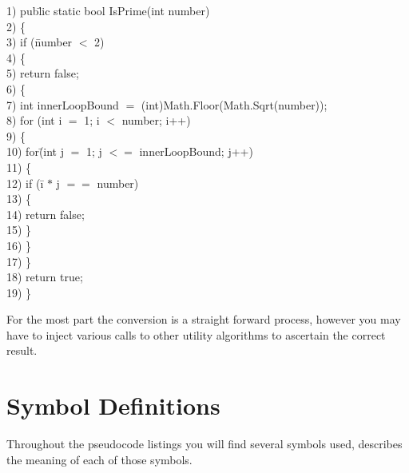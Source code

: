 \documentclass[10pt,oneside,a4paper]{report}
\begin{document}
\begin{tabbing}
1) pub\=lic static bool IsPrime(int number) \\
2) \{ \\
3) \> if (\=number $<$ 2) \\
4) \> \{ \\
5) \> \> return false; \\
6) \> \{ \\ 
7) \> int innerLoopBound $=$ (int)Math.Floor(Math.Sqrt(number)); \\
8) \> for (int i $=$ 1; i $<$ number; i++) \\
9) \> \{ \\
10) \> \> for\= (int j $=$ 1; j $<=$ innerLoopBound; j++) \\
11) \> \> \{ \\
12) \> \> \> if (\=i $*$ j $==$ number) \\
13) \> \> \> \{ \\
14) \> \> \> \> return false; \\
15) \> \> \> \} \\
16) \> \> \} \\
17) \> \} \\
18) \> return true; \\
19) \} \\
\end{tabbing}

For the most part the conversion is a straight forward process, however you may have to inject various calls to other utility algorithms to ascertain the correct result.

\chapter{Symbol Definitions}
Throughout the pseudocode listings you will find several symbols used,  describes the meaning of each of those symbols.
\end{document}
